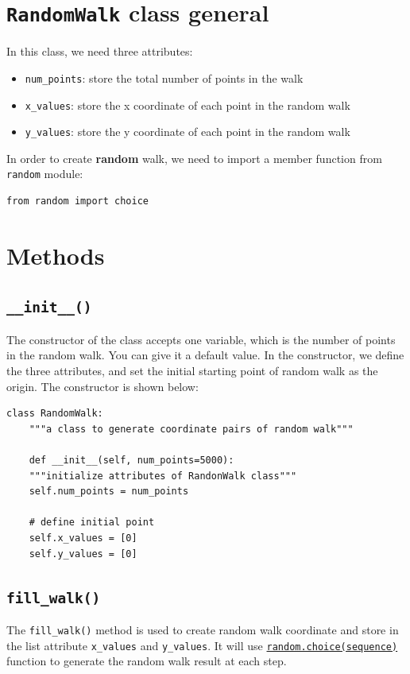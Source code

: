 \documentclass[12pt]{book}
\begin{document}
\section{\texttt{RandomWalk} class general}
\label{sec:orgbb36783}
In this class, we need three attributes:
\begin{itemize}
\item \texttt{num\_points}: store the total number of points in the walk
\item \texttt{x\_values}: store the x coordinate of each point in the random walk
\item \texttt{y\_values}: store the y coordinate of each point in the random walk
\end{itemize}

In order to create \textbf{random} walk, we need to import a member function from \texttt{random} module:
\begin{verbatim}
from random import choice
\end{verbatim}

\section{Methods}
\label{sec:orgf00bc6a}
\subsection{\texttt{\_\_init\_\_()}}
\label{sec:org502b359}
The constructor of the class accepts one variable, which is the number of points in the random walk. You can give it a default value. In the constructor, we define the three attributes, and set the initial starting point of random walk as the origin. The constructor is shown below:
\begin{verbatim}
class RandomWalk:
    """a class to generate coordinate pairs of random walk"""

    def __init__(self, num_points=5000):
	"""initialize attributes of RandonWalk class"""
	self.num_points = num_points

	# define initial point
	self.x_values = [0]
	self.y_values = [0]
\end{verbatim}

\subsection{\texttt{fill\_walk()}}
\label{sec:orga9fe588}
The \texttt{fill\_walk()} method is used to create random walk coordinate and store in the list attribute \texttt{x\_values} and \texttt{y\_values}. It will use \hyperref[orgf2e2287]{\texttt{random.choice(sequence)}} function to generate the random walk result at each step.
\end{document}
